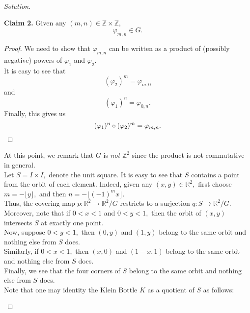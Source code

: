 \documentclass[12pt]{article}
\theoremstyle{definition}
\numberwithin{thm}{section}
\newenvironment{blockquote}
{\begin{mdframed}[skipabove=0pt, skipbelow=0pt, innertopmargin=4pt, innerbottommargin=4pt, bottomline=false,topline=false,rightline=false, linewidth=2pt]}
{\end{mdframed}}
\newenvironment{soln}{\begin{proof}[Solution]}{\end{proof}}
\begin{document}
\begin{soln}
\begin{blockquote}
			\textbf{Claim 2.} Given any $(m, n) \in \mathbb{Z}\times\mathbb{Z},$ 
			\begin{equation*} 
				\varphi_{m, n} \in G.
			\end{equation*}
			\begin{proof} 
				We need to show that $\varphi_{m, n}$ can be written as a product of (possibly negative) powers of $\varphi_1$ and $\varphi_2.$\\
				It is easy to see that
				\begin{equation*} 
					(\varphi_2)^m = \varphi_{m, 0}
				\end{equation*}
				and
				\begin{equation*} 
					(\varphi_1)^n = \varphi_{0, n}.
				\end{equation*}
				Finally, this gives us
				\begin{equation*} 
					(\varphi_1)^n\circ(\varphi_2)^m = \varphi_{m, n}. \qedhere
				\end{equation*}
			\end{proof}
		\end{blockquote}
		At this point, we remark that $G$ is \emph{not} $\mathbb{Z}^2$ since the product is not commutative in general.\\
		Let $S = I \times I,$ denote the unit square. It is easy to see that $S$ contains a point from the orbit of each element. Indeed, given any $(x, y) \in \mathbb{R}^2,$ first choose $m = -\lfloor y \rfloor,$ and then $n = -\lfloor (-1)^mx \rfloor.$\\
		Thus, the covering map $p:\mathbb{R}^2 \to \mathbb{R}^2/G$ restricts to a surjection $q:S \to \mathbb{R}^2/G.$\\
		Moreover, note that if $0 < x < 1$ and $0 < y < 1,$ then the orbit of $(x, y)$ intersects $S$ at exactly one point.\\
		Now, suppose $0 < y < 1,$ then $(0, y)$ and $(1, y)$ belong to the same orbit and nothing else from $S$ does.\\
		Similarly, if $0 < x < 1,$ then $(x, 0)$ and $(1 - x, 1)$ belong to the same orbit and nothing else from $S$ does.\\
		Finally, we see that the four corners of $S$ belong to the same orbit and nothing else from $S$ does.\\
		Note that one may identity the Klein Bottle $K$ as a quotient of $S$ as follows:
		\begin{center}
\end{center}
\end{soln}
\end{document}
